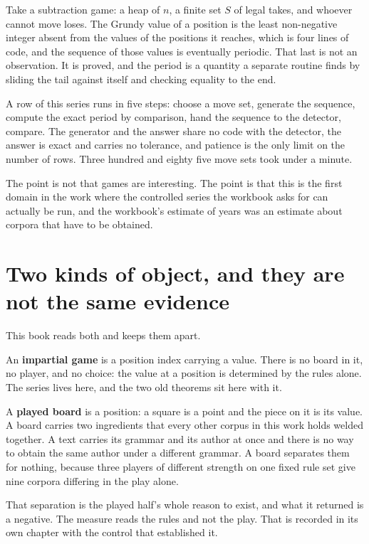 Take a subtraction game: a heap of \(n\), a finite set \(S\) of legal takes, and whoever cannot move
loses. The Grundy value of a position is the least non-negative integer absent from the values of
the positions it reaches, which is four lines of code, and the sequence of those values is
eventually periodic. That last is not an observation. It is proved, and the period is a quantity a
separate routine finds by sliding the tail against itself and checking equality to the end.

A row of this series runs in five steps: choose a move set, generate the sequence, compute the
exact period by comparison, hand the sequence to the detector, compare. The generator and the answer
share no code with the detector, the answer is exact and carries no tolerance, and patience is the
only limit on the number of rows. Three hundred and eighty five move sets took under a minute.

The point is not that games are interesting. The point is that this is the first domain in the work
where the controlled series the workbook asks for can actually be run, and the workbook's estimate
of years was an estimate about corpora that have to be obtained.

\section{Two kinds of object, and they are not the same evidence}

This book reads both and keeps them apart.

An \textbf{impartial game} is a position index carrying a value. There is no board in it, no player,
and no choice: the value at a position is determined by the rules alone. The series lives here, and
the two old theorems sit here with it.

A \textbf{played board} is a position: a square is a point and the piece on it is its value. A board
carries two ingredients that every other corpus in this work holds welded together. A text carries
its grammar and its author at once and there is no way to obtain the same author under a different
grammar. A board separates them for nothing, because three players of different strength on one
fixed rule set give nine corpora differing in the play alone.

That separation is the played half's whole reason to exist, and what it returned is a negative. The
measure reads the rules and not the play. That is recorded in its own chapter with the control that
established it.

